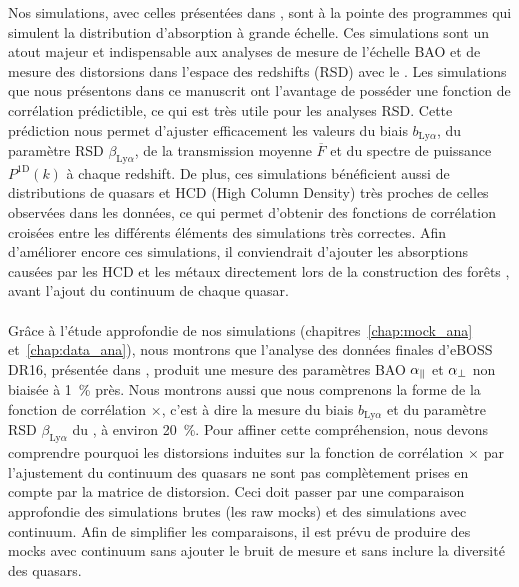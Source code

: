 Nos simulations, avec celles présentées dans \textcite{Farr2019}, sont à la pointe des programmes qui simulent la distribution d'absorption \lya{} à grande échelle. Ces simulations sont un atout majeur et indispensable aux analyses de mesure de l'échelle BAO et de mesure des distorsions dans l'espace des redshifts (RSD) avec le \lya{}. Les simulations que nous présentons dans ce manuscrit ont l'avantage de posséder une fonction de corrélation prédictible, ce qui est très utile pour les analyses RSD.
Cette prédiction nous permet d'ajuster efficacement les valeurs du biais $b_{\mathrm{Ly}\alpha}$, du paramètre RSD $\beta_{\mathrm{Ly}\alpha}$, de la transmission moyenne $\overline F$ et du spectre de puissance $P^{\mathrm{1D}}(k)$ à chaque redshift.
De plus, ces simulations bénéficient aussi de distributions de quasars et HCD (High Column Density) très proches de celles observées dans les données, ce qui permet d'obtenir des fonctions de corrélation croisées entre les différents éléments des simulations très correctes. Afin d'améliorer encore ces simulations, il conviendrait d'ajouter les absorptions causées par les HCD et les métaux directement lors de la construction des forêts \lya{}, avant l'ajout du continuum de chaque quasar.



\paragraph{}
Grâce à l'étude approfondie de nos simulations (chapitres~\ref{chap:mock_ana} et~\ref{chap:data_ana}), nous montrons que l'analyse des données finales d'eBOSS DR16, présentée dans \textcite{DuMasdesBourboux2020}, produit une mesure des paramètres BAO $\alpha_{\parallel}{}$ et $\alpha_{\perp}{}$ non biaisée à \SI{1}{\percent} près.
Nous montrons aussi que nous comprenons la forme de la fonction de corrélation \lya{}$\times$\lya{}, c'est à dire la mesure du biais $b_{\mathrm{Ly}\alpha}$ et du paramètre RSD $\beta_{\mathrm{Ly}\alpha}$ du \lya{}, à environ \SI{20}{\percent}.
Pour affiner cette compréhension, nous devons comprendre pourquoi les distorsions induites sur la fonction de corrélation \lya{}$\times$\lya{} par l'ajustement du continuum des quasars ne sont pas complètement prises en compte par la matrice de distorsion.
Ceci doit passer par une comparaison approfondie des simulations brutes (les raw mocks) et des simulations avec continuum. Afin de simplifier les comparaisons, il est prévu de produire des mocks avec continuum sans ajouter le bruit de mesure et sans inclure la diversité des quasars.

